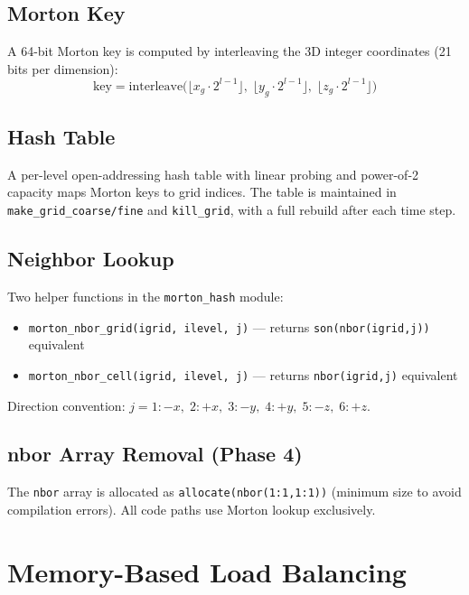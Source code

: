 \documentclass[11pt,fleqn]{book}
\begin{document}
\section{Morton Key}

A 64-bit Morton key is computed by interleaving the 3D integer coordinates (21 bits per dimension):
\[
\text{key} = \text{interleave}\bigl(\lfloor x_g \cdot 2^{l-1} \rfloor,\; \lfloor y_g \cdot 2^{l-1} \rfloor,\; \lfloor z_g \cdot 2^{l-1} \rfloor\bigr)
\]

\section{Hash Table}

A per-level open-addressing hash table with linear probing and power-of-2 capacity maps Morton keys to grid indices. The table is maintained in \texttt{make\_grid\_coarse/fine} and \texttt{kill\_grid}, with a full rebuild after each time step.

\section{Neighbor Lookup}

Two helper functions in the \texttt{morton\_hash} module:
\begin{itemize}[leftmargin=2em]
  \item \texttt{morton\_nbor\_grid(igrid, ilevel, j)} --- returns \texttt{son(nbor(igrid,j))} equivalent
  \item \texttt{morton\_nbor\_cell(igrid, ilevel, j)} --- returns \texttt{nbor(igrid,j)} equivalent
\end{itemize}

Direction convention: $j = 1{:}{-x},\; 2{:}{+x},\; 3{:}{-y},\; 4{:}{+y},\; 5{:}{-z},\; 6{:}{+z}$.

\section{nbor Array Removal (Phase 4)}

The \texttt{nbor} array is allocated as \texttt{allocate(nbor(1:1,1:1))} (minimum size to avoid compilation errors). All code paths use Morton lookup exclusively.


\chapter{Memory-Based Load Balancing}
\end{document}
